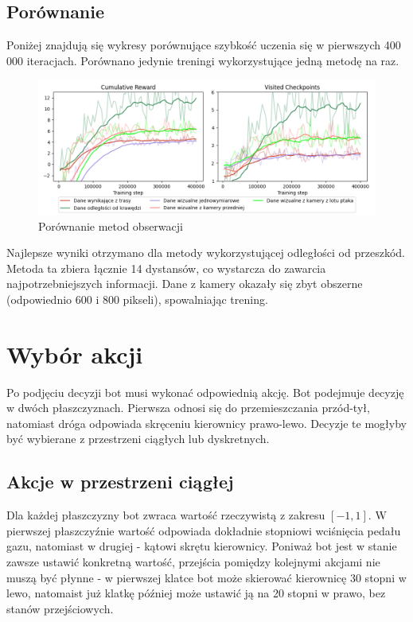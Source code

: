 \subsection{Porównanie}
Poniżej znajdują się wykresy porównujące szybkość uczenia się w pierwszych 400 000 iteracjach. Porównano jedynie treningi wykorzystujące jedną metodę na raz.
\begin{figure}[H]
    \centering
    \includegraphics[width=\textwidth]{graphs/input_observations}
    \caption{Porównanie metod obserwacji}
    \label{fig}
\end{figure}
Najlepsze wyniki otrzymano dla metody wykorzystującej odległości od przeszkód. Metoda ta zbiera łącznie 14 dystansów, co wystarcza do zawarcia najpotrzebniejszych informacji. Dane z kamery okazały się zbyt obszerne (odpowiednio 600 i 800 pikseli), spowalniając trening.
\clearpage
\section{Wybór akcji}
Po podjęciu decyzji bot musi wykonać odpowiednią akcję. Bot podejmuje decyzję w dwóch płaszczyznach. Pierwsza odnosi się do przemieszczania przód-tył, natomiast dróga odpowiada skręceniu kierownicy prawo-lewo. Decyzje te mogłyby być wybierane z przestrzeni ciągłych lub dyskretnych.

\subsection{Akcje w przestrzeni ciągłej}
Dla każdej płaszczyzny bot zwraca wartość rzeczywistą z zakresu $[-1, 1]$. W pierwszej płaszczyźnie wartość odpowiada dokładnie stopniowi wciśnięcia pedału gazu, natomiast w drugiej - kątowi skrętu kierownicy. Poniważ bot jest w stanie zawsze ustawić konkretną wartość, przejścia pomiędzy kolejnymi akcjami nie muszą być płynne - w pierwszej klatce bot może skierować kierownicę 30 stopni w lewo, natomaist już klatkę później może ustawić ją na 20 stopni w prawo, bez stanów przejściowych.

